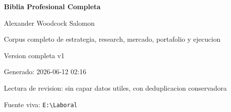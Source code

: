 \documentclass[10pt,openany]{book}
\begin{document}
\begin{titlepage}
\pagecolor{Soft}
\centering
\vspace*{1.7cm}
{\Huge\bfseries\textcolor{Accent}{Biblia Profesional Completa}\par}
\vspace{0.35cm}
{\LARGE Alexander Woodcock Salomon\par}
\vspace{1cm}
{\Large Corpus completo de estrategia, research, mercado, portafolio y ejecucion\par}
\vspace{1.3cm}
{\large Version completa v1\par}
{\large Generado: 2026-06-12 02:16\par}
\vfill
{\large Lectura de revision: sin capar datos utiles, con deduplicacion conservadora\par}
\vspace{0.5cm}
{\small Fuente viva: \texttt{E:\textbackslash{}Laboral}\par}
\clearpage
\nopagecolor
\end{titlepage}

\frontmatter
\tableofcontents
\clearpage



\mainmatter
\end{document}
